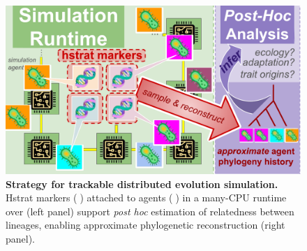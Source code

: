 \begin{figure}
  \vspace{2ex}
    \centering
  \includegraphics[width=0.8\linewidth]{img/runtime-posthoc-schematic}
  \vspace{-1.5ex}
    \caption{\textbf{Strategy for trackable distributed evolution simulation.}
    \footnotesize %
    Hstrat markers (🧬) attached to agents (🦠) in a many-CPU runtime over (left panel) support \textit{post hoc} estimation of relatedness between lineages, enabling approximate phylogenetic reconstruction (right panel).
    }
    \label{fig:runtime-posthoc-schematic}
\vspace{-0.2in}
\end{figure}
